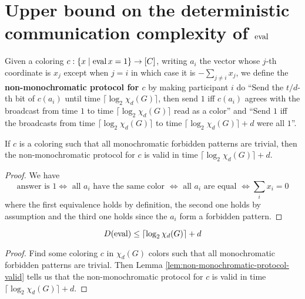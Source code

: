 \chapter{Upper bound on the deterministic communication complexity of \texorpdfstring{$\operatorname{eval}$}{eval}}

\begin{definition}
  \label{def:non-monochromatic-protocol}

  Given a coloring $c : \{x \mid \operatorname{eval} x = 1\} \to [C]$, writing $a_i$ the vector whose $j$-th coordinate is $x_j$ except when $j = i$ in which case it is $-\sum_{j \ne i} x_j$, we define the {\bf non-monochromatic protocol for $c$} by making participant $i$ do ``Send the $t / d$-th bit of $c(a_i)$ until time $\lceil\log_2\chi_d(G)\rceil$, then send $1$ iff $c(a_i)$ agrees with the broadcast from time $1$ to time $\lceil\log_2\chi_d(G)\rceil$ read as a color'' and ``Send $1$ iff the broadcasts from time $\lceil\log_2\chi_d(G)\rceil$ to time $\lceil\log_2\chi_d(G)\rceil + d$ were all $1$''.
\end{definition}

\begin{lemma}
  \label{lem:non-monochromatic-protocol-valid}

  If $c$ is a coloring such that all monochromatic forbidden patterns are trivial, then the non-monochromatic protocol for $c$ is valid in time $\lceil\log_2\chi_d(G)\rceil + d$.
\end{lemma}
\begin{proof}
  \uses{}

  We have
  $$\text{answer is } 1 \iff \text{ all $a_i$ have the same color } \iff \text{ all $a_i$ are equal } \iff \sum_i x_i = 0$$
  where the first equivalence holds by definition, the second one holds by assumption and the third one holds since the $a_i$ form a forbidden pattern.
\end{proof}

\begin{theorem}
  \label{thm:complexity-eval-corner-color-num}

  $$D(\operatorname{eval}) \le \lceil\log_2\chi_d(G)\rceil + d$$
\end{theorem}
\begin{proof}

  Find some coloring $c$ in $\chi_d(G)$ colors such that all monochromatic forbidden patterns are trivial. Then Lemma \ref{lem:non-monochromatic-protocol-valid} tells us that the non-monochromatic protocol for $c$ is valid in time $\lceil\log_2\chi_d(G)\rceil + d$.
\end{proof}

